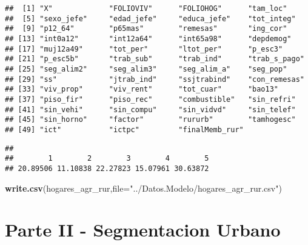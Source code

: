 \documentclass[11pt,]{article}
\newenvironment{Shaded}{\begin{snugshade}}{\end{snugshade}}
\newcommand{\KeywordTok}[1]{\textcolor[rgb]{0.13,0.29,0.53}{\textbf{#1}}}
\newcommand{\DataTypeTok}[1]{\textcolor[rgb]{0.13,0.29,0.53}{#1}}
\newcommand{\DecValTok}[1]{\textcolor[rgb]{0.00,0.00,0.81}{#1}}
\newcommand{\StringTok}[1]{\textcolor[rgb]{0.31,0.60,0.02}{#1}}
\newcommand{\OperatorTok}[1]{\textcolor[rgb]{0.81,0.36,0.00}{\textbf{#1}}}
\newcommand{\NormalTok}[1]{#1}
\begin{document}
\begin{verbatim}
##  [1] "X"             "FOLIOVIV"      "FOLIOHOG"      "tam_loc"      
##  [5] "sexo_jefe"     "edad_jefe"     "educa_jefe"    "tot_integ"    
##  [9] "p12_64"        "p65mas"        "remesas"       "ing_cor"      
## [13] "int0a12"       "int12a64"      "int65a98"      "depdemog"     
## [17] "muj12a49"      "tot_per"       "ltot_per"      "p_esc3"       
## [21] "p_esc5b"       "trab_sub"      "trab_ind"      "trab_s_pago"  
## [25] "seg_alim2"     "seg_alim3"     "seg_alim_a"    "seg_pop"      
## [29] "ss"            "jtrab_ind"     "ssjtrabind"    "con_remesas"  
## [33] "viv_prop"      "viv_rent"      "tot_cuar"      "bao13"        
## [37] "piso_fir"      "piso_rec"      "combustible"   "sin_refri"    
## [41] "sin_vehi"      "sin_compu"     "sin_vidvd"     "sin_telef"    
## [45] "sin_horno"     "factor"        "rururb"        "tamhogesc"    
## [49] "ict"           "ictpc"         "finalMemb_rur"
\end{verbatim}

\begin{Shaded}
\end{Shaded}

\begin{verbatim}
## 
##        1        2        3        4        5 
## 20.89506 11.10838 22.27823 15.07961 30.63872
\end{verbatim}

\begin{Shaded}
\begin{Highlighting}[]
\KeywordTok{write.csv}\NormalTok{(hogares_agr_rur,}\DataTypeTok{file=}\StringTok{"../Datos.Modelo/hogares_agr_rur.csv"}\NormalTok{)}
\end{Highlighting}
\end{Shaded}

\section{Parte II - Segmentacion
Urbano}\label{parte-ii---segmentacion-urbano}
\end{document}
